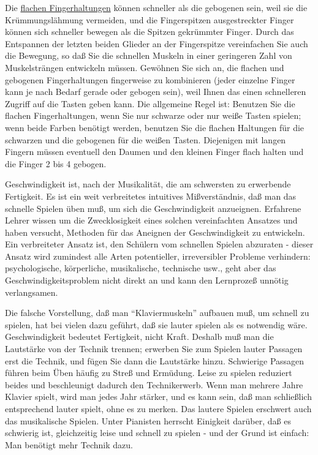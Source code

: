 Die \hyperref[c1iii4b]{flachen Fingerhaltungen} können schneller als die gebogenen sein, weil sie die Krümmungslähmung vermeiden, und die Fingerspitzen ausgestreckter Finger können sich schneller bewegen als die Spitzen gekrümmter Finger.
Durch das Entspannen der letzten beiden Glieder an der Fingerspitze vereinfachen Sie auch die Bewegung, so daß Sie die schnellen Muskeln in einer geringeren Zahl von Muskelsträngen entwickeln müssen.
Gewöhnen Sie sich an, die flachen und gebogenen Fingerhaltungen fingerweise zu kombinieren (jeder einzelne Finger kann je nach Bedarf gerade oder gebogen sein), weil Ihnen das einen schnelleren Zugriff auf die Tasten geben kann.
Die allgemeine Regel ist: Benutzen Sie die flachen Fingerhaltungen, wenn Sie nur schwarze oder nur weiße Tasten spielen; wenn beide Farben benötigt werden, benutzen Sie die flachen Haltungen für die schwarzen und die gebogenen für die weißen Tasten.
Diejenigen mit langen Fingern müssen eventuell den Daumen und den kleinen Finger flach halten und die Finger 2 bis 4 gebogen.

Geschwindigkeit ist, nach der Musikalität, die am schwersten zu erwerbende Fertigkeit.
Es ist ein weit verbreitetes intuitives Mißverständnis, daß man das schnelle Spielen üben muß, um sich die Geschwindigkeit anzueignen.
Erfahrene Lehrer wissen um die Zwecklosigkeit eines solchen vereinfachten Ansatzes und haben versucht, Methoden für das Aneignen der Geschwindigkeit zu entwickeln.
Ein verbreiteter Ansatz ist, den Schülern vom schnellen Spielen abzuraten - dieser Ansatz wird zumindest alle Arten potentieller, irreversibler Probleme verhindern: psychologische, körperliche, musikalische, technische usw., geht aber das Geschwindigkeitsproblem nicht direkt an und kann den Lernprozeß unnötig verlangsamen.

Die falsche Vorstellung, daß man \enquote{Klaviermuskeln} aufbauen muß, um schnell zu spielen, hat bei vielen dazu geführt, daß sie lauter spielen als es notwendig wäre.
Geschwindigkeit bedeutet Fertigkeit, nicht Kraft.
Deshalb muß man die Lautstärke von der Technik trennen; erwerben Sie zum Spielen lauter Passagen erst die Technik, und fügen Sie dann die Lautstärke hinzu.
Schwierige Passagen führen beim Üben häufig zu Streß und Ermüdung.
Leise zu spielen reduziert beides und beschleunigt dadurch den Technikerwerb.
Wenn man mehrere Jahre Klavier spielt, wird man jedes Jahr stärker, und es kann sein, daß man schließlich entsprechend lauter spielt, ohne es zu merken.
Das lautere Spielen erschwert auch das musikalische Spielen.
Unter Pianisten herrscht Einigkeit darüber, daß es schwierig ist, gleichzeitig leise und schnell zu spielen - und der Grund ist einfach: Man benötigt mehr Technik dazu.

